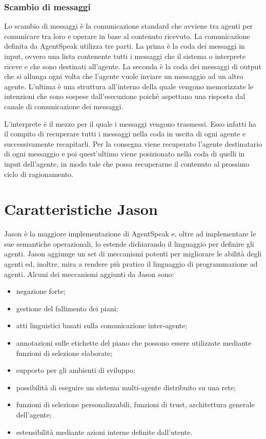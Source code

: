 \subsubsection{Scambio di messaggi}
Lo scambio di messaggi è la comunicazione standard che avviene tra agenti per comunicare tra loro e operare in base al contenuto ricevuto.
La comunicazione definita da AgentSpeak utilizza tre parti. La prima è la coda dei messaggi in input, ovvero una lista contenente tutti i messaggi che il sistema o interprete riceve e che sono destinati all'agente. La seconda è la coda dei messaggi di output che si allunga ogni volta che l'agente vuole inviare un messaggio ad un altro agente. L'ultima è una struttura all'interno della quale vengono memorizzate le intenzioni che sono sospese dall'esecuzione poichè aspettano una risposta dal canale di comunicazione dei messaggi.

L'interprete è il mezzo per il quale i messaggi vengono trasmessi. Esso infatti ha il compito di recuperare tutti i messaggi nella coda in uscita di ogni agente e successivamente recapitarli. Per la consegna viene recuperato l'agente destinatario di ogni messaggio e poi quest'ultimo viene posizionato nella coda di quelli in input dell'agente, in modo tale che possa recuperarne il contenuto al prossimo ciclo di ragionamento.

\section{Caratteristiche Jason}
Jason è la maggiore implementazione di AgentSpeak e, oltre ad implementare le sue semantiche operazionali, lo estende dichiarando il linguaggio per definire gli agenti. Jason aggiunge un set di meccanismi potenti per migliorare le abilità degli agenti ed, inoltre, mira a rendere più pratico il linguaggio di programmazione ad agenti. Alcuni dei meccanismi aggiunti da Jason sono:
\begin{itemize}
\item negazione forte;
\item gestione del fallimento dei piani;
\item atti linguistici basati sulla comunicazione inter-agente;
\item annotazioni sulle etichette del piano che possono essere utilizzate mediante funzioni di selezione elaborate;
\item supporto per gli ambienti di sviluppo;
\item possibilità di eseguire un sistema multi-agente distribuito su una rete;
\item funzioni di selezione personalizzabili, funzioni di trust, architettura generale dell'agente;
\item estensibilità mediante azioni interne definite dall'utente.
\end{itemize}

